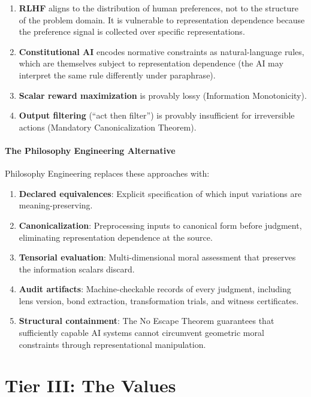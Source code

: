 \documentclass[12pt,letterpaper]{article}
\theoremstyle{definition}
\theoremstyle{plain}
\begin{document}
\begin{enumerate}
    \item \textbf{RLHF} aligns to the distribution of human preferences, not to the structure of the problem domain. It is vulnerable to representation dependence because the preference signal is collected over specific representations.
    \item \textbf{Constitutional AI} encodes normative constraints as natural-language rules, which are themselves subject to representation dependence (the AI may interpret the same rule differently under paraphrase).
    \item \textbf{Scalar reward maximization} is provably lossy (Information Monotonicity).
    \item \textbf{Output filtering} (``act then filter'') is provably insufficient for irreversible actions (Mandatory Canonicalization Theorem).
\end{enumerate}

\subsection{The Philosophy Engineering Alternative}

Philosophy Engineering replaces these approaches with:
\begin{enumerate}
    \item \textbf{Declared equivalences}: Explicit specification of which input variations are meaning-preserving.
    \item \textbf{Canonicalization}: Preprocessing inputs to canonical form before judgment, eliminating representation dependence at the source.
    \item \textbf{Tensorial evaluation}: Multi-dimensional moral assessment that preserves the information scalars discard.
    \item \textbf{Audit artifacts}: Machine-checkable records of every judgment, including lens version, bond extraction, transformation trials, and witness certificates.
    \item \textbf{Structural containment}: The No Escape Theorem guarantees that sufficiently capable AI systems cannot circumvent geometric moral constraints through representational manipulation.
\end{enumerate}


\part{Tier III: The Values}
\label{part:values}
\end{document}
